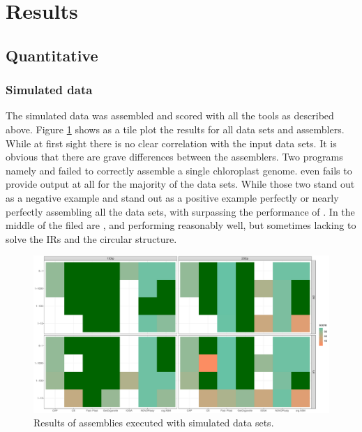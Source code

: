 \section{Results} \label{results:ca}
\subsection{Quantitative}
\subsubsection{Simulated data}
\label{results:sim}

The simulated data was assembled and scored with all the tools as described above. Figure \ref{fig:sim_tiles}
shows as a tile plot the results for all data sets and assemblers. While at first sight there is no clear
correlation with the input data sets. It is obvious that there are grave differences between the
assemblers. Two programs namely \cassp \hspace{0.5ex} and \ioga \hspace{0.5ex}failed to correctly assemble a
single chloroplast genome. \ioga even fails to provide output at all for the majority of the data sets. While
those two stand out as a negative example \fp and \go stand out as a positive example perfectly or nearly
perfectly assembling all the data sets, with \go surpassing the performance of \fp. In the middle of the filed
are \ce, \oa and \np performing reasonably well, but sometimes lacking to solve the IRs and the circular
structure.


\begin{figure}[H]
\centering
\includegraphics[height=.55\textheight, width=.99\textwidth]{Figures/sim_tiles}
\decoRule
\caption[Score of assemblies of simulated data sets]{Results of assemblies executed with simulated data sets.}
\label{fig:sim_tiles}
\end{figure}

